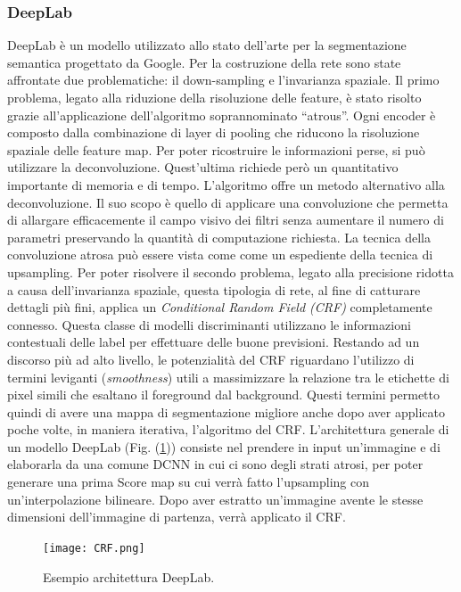 \subsubsection{DeepLab}\label{DeepL}
DeepLab è un modello utilizzato allo stato dell'arte per la segmentazione semantica 
progettato da Google. Per la costruzione della rete sono state affrontate due 
problematiche: il down-sampling e l'invarianza spaziale. Il primo problema, legato 
alla riduzione della risoluzione delle feature, è stato risolto grazie all'applicazione 
dell'algoritmo soprannominato “atrous”. Ogni encoder è composto dalla combinazione 
di layer di pooling che riducono la risoluzione spaziale delle feature map. 
Per poter ricostruire le informazioni perse, si può utilizzare la deconvoluzione. 
Quest'ultima richiede però un quantitativo importante di memoria e di tempo. 
L'algoritmo offre un metodo alternativo alla deconvoluzione. Il suo scopo 
è quello di applicare una convoluzione che permetta di allargare efficacemente il 
campo visivo dei filtri senza aumentare il numero di parametri preservando la 
quantità di computazione richiesta. La tecnica della convoluzione atrosa può essere 
vista come come un espediente della tecnica di upsampling. Per poter risolvere il 
secondo problema, legato alla precisione ridotta a causa dell'invarianza spaziale, 
questa tipologia di rete, al fine di catturare dettagli più fini, applica un \emph{Conditional 
Random Field (CRF)} completamente connesso. Questa classe di modelli 
discriminanti utilizzano le informazioni contestuali delle label per effettuare delle 
buone previsioni. Restando ad un discorso più ad alto livello, le potenzialità del 
CRF riguardano l'utilizzo di termini leviganti (\emph{smoothness}) utili a massimizzare la 
relazione tra le etichette di pixel simili che esaltano il foreground dal background. 
Questi termini permetto quindi di avere una mappa di segmentazione migliore 
anche dopo aver applicato poche volte, in maniera iterativa, l'algoritmo del CRF. 
L'architettura generale di un modello DeepLab (Fig. (\ref{CRF})) consiste nel prendere in input 
un'immagine e di elaborarla da una comune DCNN in cui ci sono degli strati 
atrosi, per poter generare una prima Score map su cui verrà fatto l'upsampling 
con un'interpolazione bilineare. Dopo aver estratto un'immagine avente le stesse
dimensioni dell'immagine di partenza, verrà applicato il CRF.
\begin{figure}
    \centering
    \texttt{[image: CRF.png]}
    \centering
    \caption{Esempio architettura DeepLab.}
    \label{CRF}
\end{figure}

